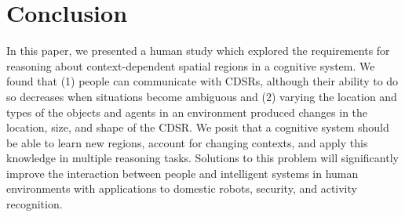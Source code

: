 \documentclass[11pt,letterpaper]{article}
\begin{document}






\section{Conclusion}


In this paper, we presented a human study which explored the requirements for reasoning about context-dependent spatial regions in a cognitive system.  We found that (1) people can communicate with CDSRs, although their ability to do so decreases when situations become ambiguous and (2) varying the location and types of the objects and agents in an environment produced changes in the location, size, and shape of the CDSR.  We posit that a cognitive system should be able to learn new regions, account for changing contexts, and apply this knowledge in multiple reasoning tasks. Solutions to this problem will significantly improve the interaction between people and intelligent systems in human environments with applications to domestic robots, security, and activity recognition.
\end{document}

